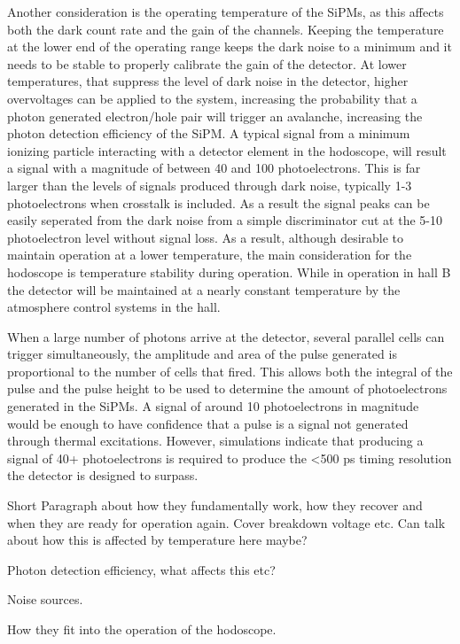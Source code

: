 Another consideration is the operating temperature of the SiPMs, as this affects both the dark count rate and the gain of the channels. Keeping the temperature at the lower end of the operating range keeps the dark noise to a minimum and it needs to be stable to properly calibrate the gain of the detector. At lower temperatures, that suppress the level of dark noise in the detector, higher overvoltages can be applied to the system, increasing the probability that a photon generated electron/hole pair will trigger an avalanche, increasing the photon detection efficiency of the SiPM. A typical signal from a minimum ionizing particle interacting with a detector element in the hodoscope, will result a signal with a magnitude of between 40 and 100 photoelectrons. This is far larger than the levels of signals produced through dark noise, typically 1-3 photoelectrons when crosstalk is included. As a result the signal peaks can be easily seperated from the dark noise from a simple discriminator cut at the 5-10 photoelectron level without signal loss. As a result, although desirable to maintain operation at a lower temperature, the main consideration for the hodoscope is temperature stability during operation. While in operation in hall B the detector will be maintained at a nearly constant temperature by the atmosphere control systems in the hall.

When a large number of photons arrive at the detector, several parallel cells can trigger simultaneously, the amplitude and area of the pulse generated is proportional to the number of cells that fired. This allows both the integral of the pulse and the pulse height to be used to determine the amount of photoelectrons generated in the SiPMs. A signal of around 10 photoelectrons in magnitude would be enough to have confidence that a pulse is a signal not generated through thermal excitations. However, simulations indicate that producing a signal of 40+ photoelectrons is required to produce the <500 ps timing resolution the detector is designed to surpass.





Short Paragraph about how they fundamentally work, how they recover and when they are ready for operation again. Cover breakdown voltage etc. Can talk about how this is affected by temperature here maybe?

Photon detection efficiency, what affects this etc? 

Noise sources.

How they fit into the operation of the hodoscope.

